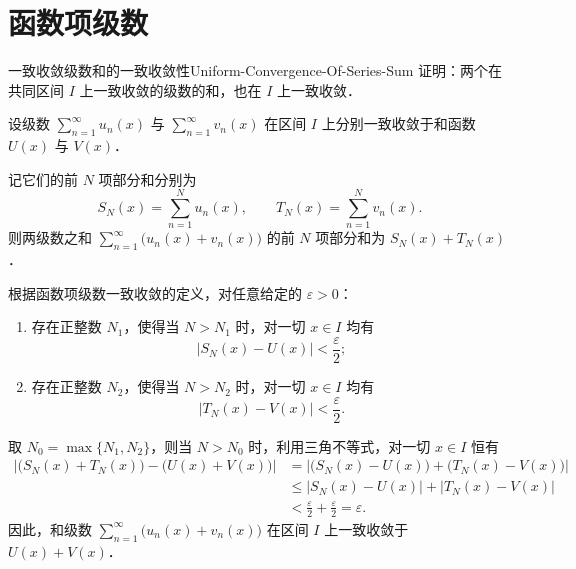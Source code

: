 \section{函数项级数}

\begin{problem}{一致收敛级数和的一致收敛性}{Uniform-Convergence-Of-Series-Sum}
    证明：两个在共同区间 $I$ 上一致收敛的级数的和，也在 $I$ 上一致收敛．
\end{problem}

\begin{myproof}
    设级数 $\sum_{n=1}^\infty u_n(x)$ 与 $\sum_{n=1}^\infty v_n(x)$ 在区间 $I$ 上分别一致收敛于和函数 $U(x)$ 与 $V(x)$．

    记它们的前 $N$ 项部分和分别为
    \begin{equation}
        S_N(x) = \sum_{n=1}^N u_n(x), \qquad T_N(x) = \sum_{n=1}^N v_n(x).
    \end{equation}
    则两级数之和 $\sum_{n=1}^\infty \bigl(u_n(x) + v_n(x)\bigr)$ 的前 $N$ 项部分和为 $S_N(x) + T_N(x)$．

    根据函数项级数一致收敛的定义，对任意给定的 $\varepsilon > 0$：
    \begin{enumerate}
        \item 存在正整数 $N_1$，使得当 $N > N_1$ 时，对一切 $x \in I$ 均有
              \begin{equation}
                  |S_N(x) - U(x)| < \frac{\varepsilon}{2};
              \end{equation}
        \item 存在正整数 $N_2$，使得当 $N > N_2$ 时，对一切 $x \in I$ 均有
              \begin{equation}
                  |T_N(x) - V(x)| < \frac{\varepsilon}{2}.
              \end{equation}
    \end{enumerate}
    取 $N_0 = \max\{N_1, N_2\}$，则当 $N > N_0$ 时，利用三角不等式，对一切 $x \in I$ 恒有
    \begin{equation}
        \begin{aligned}
            \bigl| \bigl(S_N(x) + T_N(x)\bigr) - \bigl(U(x) + V(x)\bigr) \bigr| & = \bigl| \bigl(S_N(x) - U(x)\bigr) + \bigl(T_N(x) - V(x)\bigr) \bigr| \\
                                                                                & \leqslant |S_N(x) - U(x)| + |T_N(x) - V(x)|                           \\
                                                                                & < \frac{\varepsilon}{2} + \frac{\varepsilon}{2} = \varepsilon.
        \end{aligned}
    \end{equation}
    因此，和级数 $\sum_{n=1}^\infty \bigl(u_n(x) + v_n(x)\bigr)$ 在区间 $I$ 上一致收敛于 $U(x) + V(x)$．
\end{myproof}

